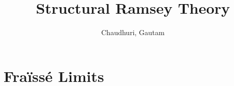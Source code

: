 \documentclass{article}
\title{Structural Ramsey Theory}
\author{Chaudhuri, Gautam}
\begin{document}
\maketitle

\section{Fraïssé Limits}
\label{sec:1}
\end{document}
